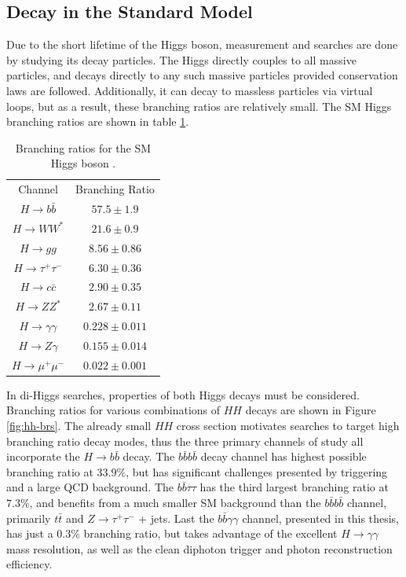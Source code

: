\subsection{Decay in the Standard Model}

Due to the short lifetime of the Higgs boson, measurement and searches are done by studying its decay particles. The Higgs directly couples to all massive particles, and decays directly to any such massive particles provided conservation laws are followed. Additionally, it can decay to massless particles via virtual loops, but as a result, these branching ratios are relatively small. The \gls{SM} Higgs branching ratios are shown in table \ref{tab:higgs-decays}. 

\begin{table}[!thp]
    \centering
    \begin{tabular}{c|c}
        Channel & Branching Ratio \\
        \cline{1-2}
        $H \rightarrow b\bar{b}$ & $57.5 \pm 1.9$\\
        $H \rightarrow WW^*$ & $21.6 \pm 0.9$\\
        $H \rightarrow gg$ & $8.56 \pm 0.86$\\
        $H \rightarrow \tau^+ \tau^-$ & $6.30 \pm 0.36$\\
        $H \rightarrow c\bar{c}$ & $2.90 \pm 0.35$\\
        $H \rightarrow ZZ^*$ & $2.67 \pm 0.11$\\
        $H \rightarrow \gamma\gamma$ & $0.228 \pm 0.011$\\
        $H \rightarrow Z\gamma$ & $0.155 \pm 0.014$\\
        $H \rightarrow \mu^+ \mu^-$ & $0.022 \pm 0.001$
    \end{tabular}
    \label{tab:higgs-decays}
    \caption{Branching ratios for the \gls{SM} Higgs boson \cite{pdg}.}
\end{table}

In di-Higgs searches, properties of both Higgs decays must be considered. Branching ratios for various combinations of $HH$ decays are shown in Figure \ref{fig:hh-brs}. The already small $HH$ cross section motivates searches to target high branching ratio decay modes, thus the three primary channels of study all incorporate the $H\rightarrow b\bar{b}$ decay. The $b\bar{b}b\bar{b}$ decay channel has highest possible branching ratio at $33.9\%$, but has significant challenges presented by triggering and a large QCD background. The $b\bar{b}\tau \tau$ has the third largest branching ratio at $7.3\%$, and benefits from a much smaller \gls{SM} background than the $b\bar{b}b\bar{b}$ channel, primarily $t\bar{t}$ and $Z\rightarrow \tau^+ \tau^-$ + jets. Last the $b\bar{b} \gamma \gamma$ channel, presented in this thesis, has just a $0.3\%$ branching ratio, but takes advantage of the excellent $H\rightarrow \gamma\gamma$ mass resolution, as well as the clean diphoton trigger and photon reconstruction efficiency.

